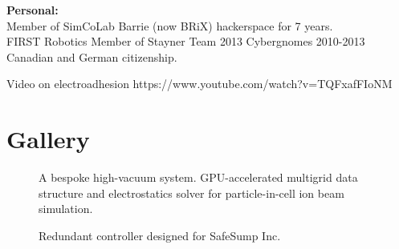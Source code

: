 \documentclass[fleqn,11pt]{article}
\begin{document}
%
\begin{tcolorbox}
	\textbf{Personal:\\}
	Member of SimCoLab Barrie (now BRiX) hackerspace for 7 years.\\
	FIRST Robotics  Member of Stayner Team 2013	Cybergnomes	2010-2013\\
	Canadian and German citizenship.
\end{tcolorbox}
%


Video on electroadhesion 
https://www.youtube.com/watch?v=TQFxafFIoNM







\section{Gallery}
\begin{figure}[H]
	\centering
	\caption*{A bespoke high-vacuum system. GPU-accelerated multigrid data structure and electrostatics solver for particle-in-cell ion beam simulation.}
	\hfill
	
\end{figure}



\begin{figure}[H]
	\centering
	\caption*{Redundant controller designed for SafeSump Inc.}
	\hfill
	
\end{figure}
\end{document}
